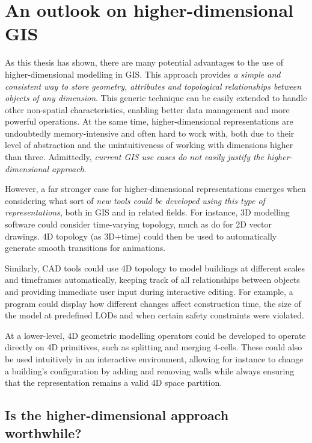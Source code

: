 \section{An outlook on higher-dimensional GIS}
\label{se:isitworthit}

As this thesis has shown, there are many potential advantages to the use of higher-dimensional modelling in GIS.\@
This approach provides \emph{a simple and consistent way to store geometry, attributes and topological relationships between objects of any dimension}.
This generic technique can be easily extended to handle other non-spatial characteristics, enabling better data management and more powerful operations.
At the same time, higher-dimensional representations are undoubtedly memory-intensive and often hard to work with, both due to their level of abstraction and the unintuitiveness of working with dimensions higher than three.
Admittedly, \emph{current GIS use cases do not easily justify the higher-dimensional approach}.


However, a far stronger case for higher-dimensional representations emerges when considering what sort of \emph{new tools could be developed using this type of representations}, both in GIS and in related fields.
For instance, 3D modelling software could consider time-varying topology, much as \citet{Dalstein15} do for 2D vector drawings.
4D topology (as 3D+time) could then be used to automatically generate smooth transitions for animations.

Similarly, CAD tools could use 4D topology to model buildings at different scales and timeframes automatically, keeping track of all relationships between objects and providing immediate user input during interactive editing.
For example, a program could display how different changes affect construction time, the size of the model at predefined LODs and when certain safety constraints were violated.

At a lower-level, 4D geometric modelling operators could be developed to operate directly on 4D primitives, such as splitting and merging 4-cells.
These could also be used intuitively in an interactive environment, allowing for instance to change a building's configuration by adding and removing walls while always ensuring that the representation remains a valid 4D space partition.


\subsection*{Is the higher-dimensional approach worthwhile?}

